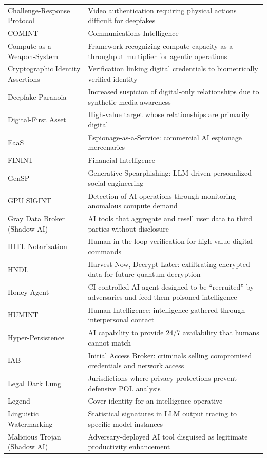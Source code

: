\documentclass[11pt,letterpaper]{article}
\begin{document}
{\begin{longtable}{L{4.8cm}L{11.4cm}}
Challenge-Response Protocol & Video authentication requiring physical actions difficult for deepfakes \\
COMINT & Communications Intelligence \\
Compute-as-a-Weapon-System & Framework recognizing compute capacity as a throughput multiplier for agentic operations \\
Cryptographic Identity Assertions & Verification linking digital credentials to biometrically verified identity \\
Deepfake Paranoia & Increased suspicion of digital-only relationships due to synthetic media awareness \\
Digital-First Asset & High-value target whose relationships are primarily digital \\
EaaS & Espionage-as-a-Service: commercial AI espionage mercenaries \\
FININT & Financial Intelligence \\
GenSP & Generative Spearphishing: LLM-driven personalized social engineering \\
GPU SIGINT & Detection of AI operations through monitoring anomalous compute demand \\
Gray Data Broker (Shadow AI) & AI tools that aggregate and resell user data to third parties without disclosure \\
HITL Notarization & Human-in-the-loop verification for high-value digital commands \\
HNDL & Harvest Now, Decrypt Later: exfiltrating encrypted data for future quantum decryption \\
Honey-Agent & CI-controlled AI agent designed to be ``recruited'' by adversaries and feed them poisoned intelligence \\
HUMINT & Human Intelligence: intelligence gathered through interpersonal contact \\
Hyper-Persistence & AI capability to provide 24/7 availability that humans cannot match \\
IAB & Initial Access Broker: criminals selling compromised credentials and network access \\
Legal Dark Lung & Jurisdictions where privacy protections prevent defensive POL analysis \\
Legend & Cover identity for an intelligence operative \\
Linguistic Watermarking & Statistical signatures in LLM output tracing to specific model instances \\
Malicious Trojan (Shadow AI) & Adversary-deployed AI tool disguised as legitimate productivity enhancement \\

\end{longtable}}
\end{document}
